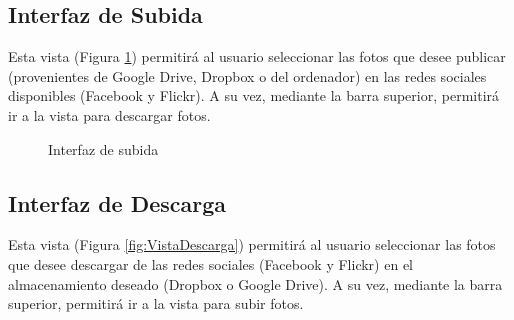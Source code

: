 \documentclass{scrartcl}
\begin{document}
\subsection{Interfaz de Subida}
Esta vista (Figura \ref{fig:VistaSubida}) permitirá al usuario seleccionar las fotos que desee publicar (provenientes de Google Drive, Dropbox o del ordenador) en las redes sociales disponibles (Facebook y Flickr). A su vez, mediante la barra superior, permitirá ir a la vista para descargar fotos.
\begin{figure}[H]
	
	\centering
	\caption{Interfaz de subida}
	\label{fig:VistaSubida}
	
\end{figure}
\vspace*{2in}
\subsection{Interfaz de Descarga}
Esta vista (Figura \ref{fig:VistaDescarga}) permitirá al usuario seleccionar las fotos que desee descargar de las redes sociales (Facebook y Flickr) en el almacenamiento deseado (Dropbox o Google Drive). A su vez, mediante la barra superior, permitirá ir a la vista para subir fotos.
\end{document}
